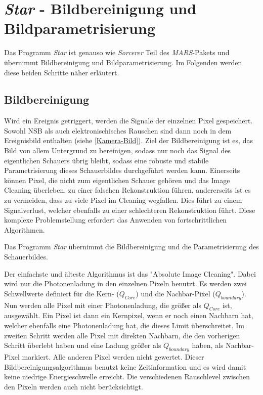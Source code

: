 \section{\textit{Star} - Bildbereinigung und Bildparametrisierung}
\label{sec:Star-ImageCleaning}
Das Programm \textit{Star} ist genauso wie \textit{Sorcerer} Teil des \textit{MARS}-Pakets und übernimmt Bildbereinigung und Bildparametrisierung.
Im Folgenden werden diese beiden Schritte näher erläutert.


\subsection{Bildbereinigung}

Wird ein Ereignis getriggert, werden die Signale der einzelnen Pixel gespeichert.
Sowohl NSB als auch elektronischisches Rauschen sind dann noch in dem Ereignisbild enthalten (siehe \autoref{Kamera-Bild}).
Ziel der Bildbereinigung ist es, das Bild von allem Untergrund zu bereinigen, sodass nur noch das Signal des eigentlichen Schauers übrig bleibt, sodass eine robuste und stabile Parametrisierung dieses Schauerbildes durchgeführt werden kann.
Einerseits können Pixel, die nicht zum eigentlichen Schauer gehören und das Image Cleaning überleben, zu einer falschen Rekonstruktion führen, andererseits ist es zu vermeiden, dass zu viele Pixel im Cleaning wegfallen. 
Dies führt zu einem Signalverlust, welcher ebenfalls zu einer schlechteren Rekonstruktion führt.
Diese komplexe Problemstellung erfordert das Anwenden von fortschrittlichen Algorithmen.

Das Programm \textit{Star} übernimmt die Bildbereinigung und die Parametrisierung des Schauerbildes.

Der einfachste und älteste Algorithmus ist das "Absolute Image Cleaning".
Dabei wird nur die Photonenladung in den einzelnen Pixeln benutzt.
Es werden zwei Schwellwerte definiert für die Kern- ($Q_{Core}$) und die Nachbar-Pixel ($Q_{boundary}$).
Nun werden alle Pixel mit einer Photonenladung, die größer als $Q_{Core}$ ist, ausgewählt.
Ein Pixel ist dann ein Kernpixel, wenn er noch einen Nachbarn hat, welcher ebenfalls eine Photonenladung hat, die dieses Limit überschreitet.
Im zweiten Schritt werden alle Pixel mit direkten Nachbarn, die den vorherigen Schritt überlebt haben und eine Ladung größer als $Q_{boundary}$ haben, als Nachbar-Pixel markiert.
Alle anderen Pixel werden nicht gewertet.
Dieser Bildbereinigungsalgorithmus benutzt keine Zeitinformation und es wird damit keine niedrige Energieschwelle erreicht. 
Die verschiedenen Rauschlevel zwischen den Pixeln werden auch nicht berücksichtigt.

